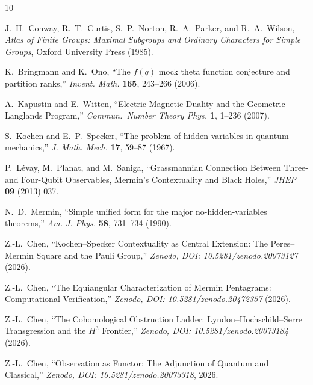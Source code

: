 \documentclass[11pt,a4paper]{article}
\theoremstyle{remark}
\begin{document}
\begin{thebibliography}{10}

J.~H.~Conway, R.~T.~Curtis, S.~P.~Norton, R.~A.~Parker, and R.~A.~Wilson,
\textit{Atlas of Finite Groups: Maximal Subgroups and Ordinary Characters
for Simple Groups},
Oxford University Press (1985).

K.~Bringmann and K.~Ono,
``The $f(q)$ mock theta function conjecture and partition ranks,''
\textit{Invent. Math.} \textbf{165}, 243--266 (2006).

A.~Kapustin and E.~Witten,
``Electric-Magnetic Duality and the Geometric Langlands Program,''
\textit{Commun.\ Number Theory Phys.} \textbf{1}, 1--236 (2007).

S.~Kochen and E.~P.~Specker,
``The problem of hidden variables in quantum mechanics,''
\textit{J. Math. Mech.} \textbf{17}, 59--87 (1967).

P.~L\'evay, M.~Planat, and M.~Saniga,
``Grassmannian Connection Between Three- and Four-Qubit Observables,
Mermin's Contextuality and Black Holes,''
\textit{JHEP} \textbf{09} (2013) 037.

N.~D.~Mermin,
``Simple unified form for the major no-hidden-variables theorems,''
\textit{Am. J. Phys.} \textbf{58}, 731--734 (1990).

Z.-L.~Chen,
``Kochen--Specker Contextuality as Central Extension:
The Peres--Mermin Square and the Pauli Group,''
\textit{Zenodo, DOI: 10.5281/zenodo.20073127} (2026).

Z.-L.~Chen,
``The Equiangular Characterization of Mermin Pentagrams:
Computational Verification,''
\textit{Zenodo, DOI: 10.5281/zenodo.20472357} (2026).

Z.-L.~Chen,
``The Cohomological Obstruction Ladder:
Lyndon--Hochschild--Serre Transgression and the $H^3$ Frontier,''
\textit{Zenodo, DOI: 10.5281/zenodo.20073184} (2026).

Z.-L.~Chen,
``Observation as Functor: 
The Adjunction of Quantum and Classical,''
\textit{Zenodo, DOI: 10.5281/zenodo.20073318}, 2026.


\end{thebibliography}
\end{document}
